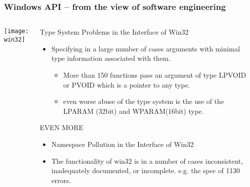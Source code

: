 \begin{frame}[plain]
	\frametitle{Windows API -- from the view of software engineering}
	
	
	
	\begin{columns}
		
		\begin{column}{.4\textwidth}
			
			\texttt{[image: win32]}
			
		\end{column}
		
		\begin{column}{.6\textwidth}
			
			Type System Problems in the Interface of Win32
			
			\begin{itemize}
				\item Specifying in a large number
				of cases arguments with minimal type information associated with them. 
				\begin{itemize}	
					\item More than 150 functions pass an argument of type LPVOID or PVOID which is a 	pointer to any type.
					
					\item  even worse abuse of the type system is the use of the LPARAM (32bit) and WPARAM(16bit) type.
				\end{itemize}
			\end{itemize}
		
		EVEN MORE
		\begin{itemize}
		\item Namespace Pollution in the Interface of Win32
		
		\item The functionality of win32 is in a number of cases inconsistent, inadequately documented, or incomplete.  e.g. the spec of 1130 errors.
		\end{itemize}
		\end{column}		
	\end{columns}
	
	
\end{frame}

